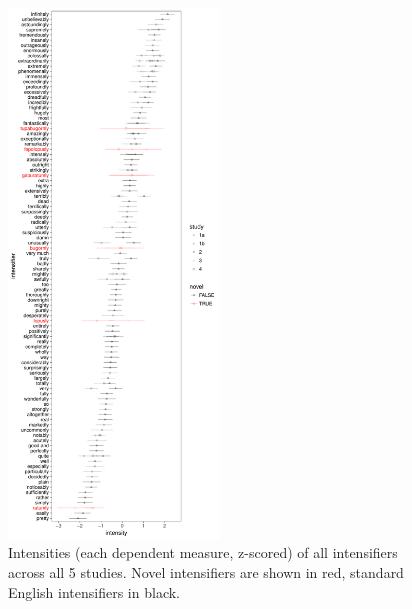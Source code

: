 \begin{figure}[hbt]
\begin{center}
\includegraphics[width=0.5\textwidth]{images/intensities.pdf}
\end{center}
\caption{Intensities (each dependent measure, z-scored) of all intensifiers across all 5 studies. Novel intensifiers are shown in red, standard English intensifiers in black.}
\label{fig:intensities}
\end{figure}


